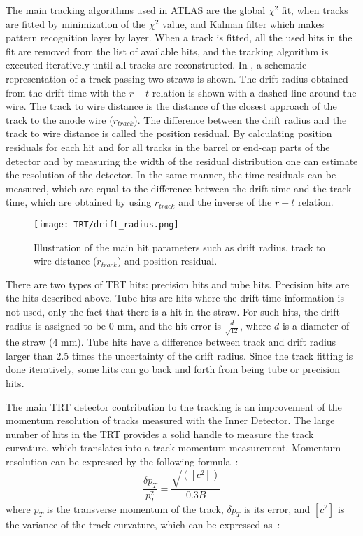 The main tracking algorithms used in ATLAS are the global $\chi^2$ fit, when tracks are fitted by minimization of the $\chi^2$ value, and Kalman filter which makes pattern recognition
layer by layer. When a track is fitted, all the used hits in the fit are removed from the list of available hits, and the tracking algorithm is executed iteratively until all tracks are reconstructed.
In , a schematic representation of a track passing two straws is shown. The drift radius obtained from the drift time with the $r-t$ relation is
shown with a dashed line around the wire. The track to wire distance is the distance of the closest approach of the track to the anode wire ($r_{track}$). The difference
between the drift radius and the track to wire distance is called the position residual. By calculating position residuals for each hit and for all
tracks in the barrel or end-cap parts of the detector and by measuring the width of the residual distribution one can estimate the resolution of the detector.
In the same manner, the time residuals can be measured, which are equal to the difference between the drift time and the track time, which are obtained by using $r_{track}$ and the inverse of the
$r-t$ relation.


\begin{figure}[h]
\centering
\texttt{[image: TRT/drift\_radius.png]}
\caption{ 
 Illustration of the main hit parameters such as drift radius, track to wire distance ($r_{track}$) and position residual.
}
\label{fig:drift_radius}
\end{figure}

There are two types of TRT hits: precision hits and tube hits. Precision hits are the hits described above. Tube hits are hits where the drift time 
information is not used, only the fact that there is a hit in the straw. For such hits, the drift radius is assigned to be 0 mm, and the hit error is $\frac{d}{\sqrt{12}}$, where
$d$ is a diameter of the straw (4 mm). Tube hits have a difference between track and drift radius larger than
2.5 times the uncertainty of the drift radius. Since the track fitting is done iteratively, some hits can go back and forth from being tube or precision hits.

The main TRT detector contribution to the tracking is an improvement of the momentum resolution of tracks measured with the Inner Detector. The large number of hits in the TRT provides
a solid handle to measure the track curvature, which translates into a track momentum measurement. Momentum resolution can be expressed by the following formula~\cite{mom_res_book,Gluckstern:1963ng}:
\begin{equation}
\dfrac{\delta p_T}{p_T^2} = \dfrac{\sqrt{([c^2])}}{0.3B}
 \label{eq:momentum_resolution}
\end{equation}
where $p_T$ is the transverse momentum of the track, $\delta p_T$ is its error, and $[c^2]$ is the variance of the track curvature, which can be expressed as~\cite{mom_res_book}:


